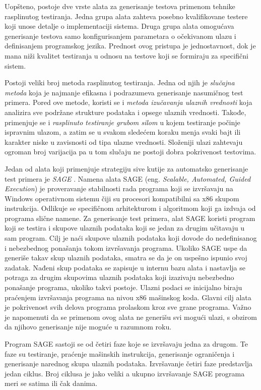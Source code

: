 \documentclass[12pt,oneside]{memoir}
\begin{document}
Uopšteno, postoje dve vrste alata za generisanje testova primenom tehnike rasplinutog testiranja. Jedna grupa alata zahteva posebno kvalifikovane testere koji unose detalje o implementaciji sistema. Druga grupa alata omogućava generisanje testova samo konfigurisanjem parametara o očekivanom ulazu i definisanjem programskog jezika. Prednost ovog pristupa je jednostavnost, dok je mana niži kvalitet testiranja u odnosu na testove koji se formiraju za specifični sistem. 
\par
Postoji veliki broj metoda rasplinutog testiranja. Jedna od njih je \emph{slučajna metoda} koja je najmanje efikasna i podrazumeva generisanje nasumičnog test primera. Pored ove metode, koristi se i \emph{metoda izučavanja ulaznih vrednosti} koja analizira sve podržane strukture podataka i opsege ulaznih vrednosti. Takođe, primenjuje se i \emph{rasplinuto testiranje grubom silom} u kojem testiranje počinje ispravnim ulazom, a zatim se u svakom sledećem koraku menja svaki bajt ili karakter niske u zavisnosti od tipa ulazne vrednosti. Složeniji ulazi zahtevaju ogroman broj varijacija pa u tom slučaju ne postoji dobra pokrivenost testovima.
\par
Jedan od alata koji primenjuje strategiju sive kutije za automatsko generisanje test primera je \emph{SAGE} \cite{ToolSAGE}. Namena alata SAGE (eng. \textit{Scalable, Automated, Guided Execution}) je proveravanje stabilnosti rada programa koji se izvršavaju na Windows operativnom sistemu čiji su procesori kompatibilni sa x86 skupom instrukcija. Odlikuje se specifičnom arhitekturom i algoritmom koji ga izdvaja od programa slične namene. Za generisanje test primera, alat SAGE koristi program koji se testira i skupove ulaznih podataka koji se jedan za drugim učitavaju u sam program. Cilj je naći skupove ulaznih podataka koji dovode do nedefinisanog i nebezbednog ponašanja tokom izvršavanja programa. Ukoliko SAGE uspe da generiše takav skup ulaznih podataka, smatra se da je on uspešno ispunio svoj zadatak. Nađeni skup podataka se zapisuje u internu bazu alata i nastavlja se potraga za drugim skupovima ulaznih podataka koji izazivaju nebezbedno ponašanje programa, ukoliko takvi postoje. Ulazni podaci se inicijalno biraju praćenjem izvršavanja programa na nivou x86 mašinskog koda. Glavni cilj alata je pokrivenost svih delova programa prolaskom kroz sve grane programa. Važno je napomenuti da se primenom ovog alata ne generišu svi mogući ulazi, s obzirom da njihovo generisanje nije moguće u razumnom roku. 
\par
Program SAGE sastoji se od četiri faze koje se izvršavaju jedna za drugom. Te faze su testiranje, praćenje mašinskih instrukcija, generisanje ograničenja i generisanje narednog skupa ulaznih podataka. Izvršavanje četiri faze predstavlja jedan ciklus. Broj ciklusa je jako veliki a ukupno izvršavanje SAGE programa meri se satima ili čak danima. 
\end{document}
